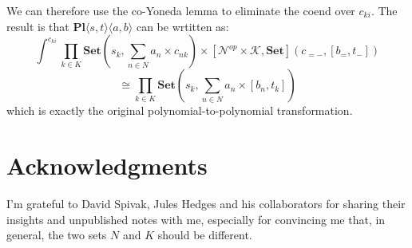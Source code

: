 \documentclass[11pt]{amsart}
\begin{document}
 
 We can therefore use the co-Yoneda lemma to eliminate the coend over $c_{ki}$. The result is that $\mathbf{Pl}\langle s, t\rangle \langle a, b\rangle$ can be wrtitten as:
 \[ \int^{c_{k i}} 
 \prod_{k \in K} \mathbf{Set} \left(s_k,  \sum_{n \in N} a_n \times c_{n k} \right) \times 
 [\mathcal{N}^{op} \times \mathcal{K}, \mathbf{Set}]\left(c_{= -}, [b_=, t_- ]\right) \]
\[
\cong  \prod_{k \in K} \mathbf{Set}\left(s_k, \sum_{n \in N} a_n \times [b_n, t_k] \right)
 \]
which is exactly the original polynomial-to-polynomial transformation.

\section{Acknowledgments}
I'm grateful to David Spivak, Jules Hedges and his collaborators for sharing their insights and unpublished notes with me, especially for convincing me that, in general, the two sets $N$ and $K$ should be different.
        
\end{document}
